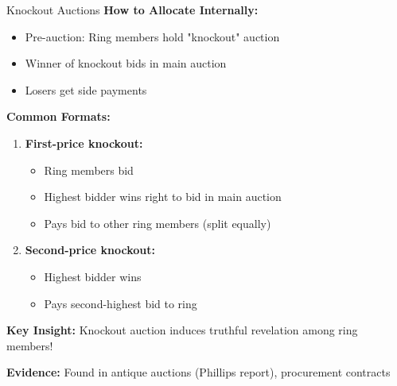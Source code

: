 \documentclass[xcolor={x11names}, aspectratio=169 ]{beamer}
\begin{document}
\begin{frame}{Knockout Auctions}
\textbf{How to Allocate Internally:}
\begin{itemize}
  \item Pre-auction: Ring members hold "knockout" auction
  \item Winner of knockout bids in main auction
  \item Losers get side payments
\end{itemize}

\textbf{Common Formats:}
\begin{enumerate}
  \item \textbf{First-price knockout:}
  \begin{itemize}
    \item Ring members bid
    \item Highest bidder wins right to bid in main auction
    \item Pays bid to other ring members (split equally)
  \end{itemize}
  
  \item \textbf{Second-price knockout:}
  \begin{itemize}
    \item Highest bidder wins
    \item Pays second-highest bid to ring
  \end{itemize}
\end{enumerate}

\textbf{Key Insight:} Knockout auction induces truthful revelation among ring members!

\textbf{Evidence:} Found in antique auctions (Phillips report), procurement contracts
\end{frame}
\end{document}
